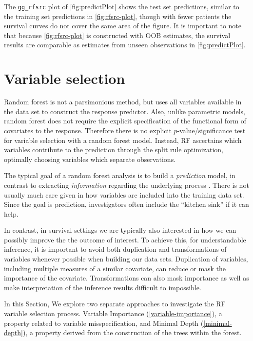 \documentclass[article, nojss]{jss}
\begin{document}
The \texttt{gg\_rfsrc} plot of \autoref{fig:predictPlot} shows the test
set predictions, similar to the training set predictions in
\autoref{fig:rfsrc-plot}, though with fewer patients the survival curves
do not cover the same area of the figure. It is important to note that
because \autoref{fig:rfsrc-plot} is constructed with OOB estimates, the
survival results are comparable as estimates from unseen observations in
\autoref{fig:predictPlot}.

\section{Variable selection}\label{variable-selection}

Random forest is not a parsimonious method, but uses all variables
available in the data set to construct the response predictor. Also,
unlike parametric models, random forest does not require the explicit
specification of the functional form of covariates to the response.
Therefore there is no explicit \(p\)-value/significance test for
variable selection with a random forest model. Instead, RF ascertains
which variables contribute to the prediction through the split rule
optimization, optimally choosing variables which separate observations.

The typical goal of a random forest analysis is to build a
\emph{prediction} model, in contrast to extracting \emph{information}
regarding the underlying process \citep{Breiman:twoCultures:2001}. There
is not usually much care given in how variables are included into the
training data set. Since the goal is prediction, investigators often
include the ``kitchen sink'' if it can help.

In contrast, in survival settings we are typically also interested in
how we can possibly improve the the outcome of interest. To achieve
this, for understandable inference, it is important to avoid both
duplication and transformations of variables whenever possible when
building our data sets. Duplication of variables, including multiple
measures of a similar covariate, can reduce or mask the importance of
the covariate. Transformations can also mask importance as well as make
interpretation of the inference results difficult to impossible.

In this Section, We explore two separate approaches to investigate the
RF variable selection process. Variable Importance
(\autoref{variable-importance}), a property related to variable
misspecification, and Minimal Depth (\autoref{minimal-depth}), a
property derived from the construction of the trees within the forest.
\end{document}
